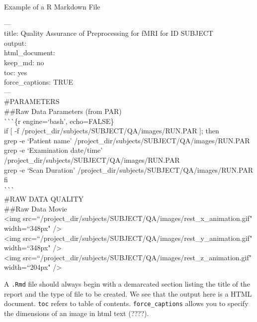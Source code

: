 \begin{bash}{Example of a R Markdown File}

--- \\
title: Quality Assurance of Preprocessing for fMRI for ID SUBJECT \\
output: \\
  html_document: \\
    keep_md: no \\
    toc: yes \\
    force_captions: TRUE \\
--- \\

\#PARAMETERS \\

\#\#Raw Data Parameters (from PAR) \\

\`{}\`{}\`{}\{r engine=`bash', echo=FALSE\} \\
if [ -f /project_dir/subjects/SUBJECT/QA/images/RUN.PAR ]; then \\
  grep -e `Patient name' /project_dir/subjects/SUBJECT/QA/images/RUN.PAR \\
  grep -e `Examination date/time' /project_dir/subjects/SUBJECT/QA/images/RUN.PAR \\
  grep -e `Scan Duration' /project_dir/subjects/SUBJECT/QA/images/RUN.PAR \\
fi \\
\`{}\`{}\`{} \\

\#RAW DATA QUALITY \\

\#\#Raw Data Movie \\

<img src=``/project_dir/subjects/SUBJECT/QA/images/rest_x_animation.gif" width=``348px" /> \\
<img src=``/project_dir/subjects/SUBJECT/QA/images/rest_y_animation.gif" width=``348px" /> \\
<img src=``/project_dir/subjects/SUBJECT/QA/images/rest_z_animation.gif" width=``204px" /> \\
\end{bash}

A \texttt{.Rmd} file should always begin with a demarcated section listing the title of the report and the type of file to be created. We see that the output here is a HTML document. \texttt{toc} refers to table of contents. \texttt{force_captions} allows you to specify the dimensions of an image in html text (????). %

